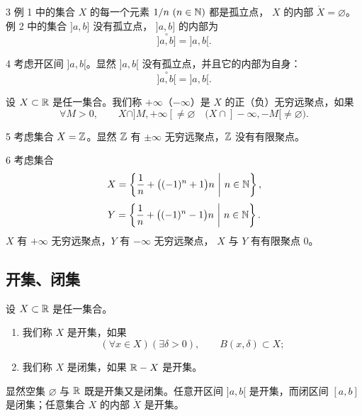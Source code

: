 \begin{sourceexample}{3}
例 1 中的集合 \(X\) 的每一个元素 \(1/n\ (n\in\mathbb{N})\) 都是孤立点，
\(X\) 的内部 \(\mathring X=\varnothing\)。例 2 中的集合 \(]a,b]\) 没有孤立点，
\(]a,b]\) 的内部为
\[
\overset{\circ}{]a,b]}=]a,b[.
\]
\end{sourceexample}

\begin{sourceexample}{4}
考虑开区间 \(]a,b[\)。显然 \(]a,b[\) 没有孤立点，并且它的内部为自身：
\[
\overset{\circ}{]a,b[}=]a,b[.
\]
\end{sourceexample}

\begin{mydef*}{}
设 \(X\subset\mathbb{R}\) 是任一集合。我们称 \(+\infty\)（\(-\infty\)）是 \(X\)
的正（负）无穷远聚点，如果
\[
\forall M>0,\qquad
X\cap]M,+\infty[\neq\varnothing
\quad
\bigl(X\cap]-\infty,-M[\neq\varnothing\bigr).
\]
\end{mydef*}

\begin{sourceexample}{5}
考虑集合 \(X=\mathbb{Z}\)。显然 \(\mathbb{Z}\) 有 \(\pm\infty\) 无穷远聚点，\(\mathbb{Z}\)
没有有限聚点。
\end{sourceexample}

\begin{sourceexample}{6}
考虑集合
\[
X=\left\{\frac1n+\bigl((-1)^n+1\bigr)n\ \middle|\ n\in\N\right\},
\]
\[
Y=\left\{\frac1n+\bigl((-1)^n-1\bigr)n\ \middle|\ n\in\N\right\}.
\]
\(X\) 有 \(+\infty\) 无穷远聚点，\(Y\) 有 \(-\infty\) 无穷远聚点，
\(X\) 与 \(Y\) 有有限聚点 \(0\)。
\end{sourceexample}

\subsection{开集、闭集}

\begin{mydef*}{}
设 \(X\subset\mathbb{R}\) 是任一集合。
\begin{enumerate}[label=\arabic*)]
  \item 我们称 \(X\) 是开集，如果
  \[
  (\forall x\in X)(\exists\delta>0),\qquad B(x,\delta)\subset X;
  \]
  \item 我们称 \(X\) 是闭集，如果 \(\mathbb{R}-X\) 是开集。
\end{enumerate}
\end{mydef*}

显然空集 \(\varnothing\) 与 \(\mathbb{R}\) 既是开集又是闭集。任意开区间 \(]a,b[\)
是开集，而闭区间 \([a,b]\) 是闭集；任意集合 \(X\) 的内部 \(\mathring X\) 是开集。

